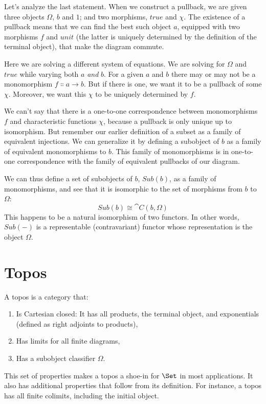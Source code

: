 Let's analyze the last statement. When we construct a pullback, we are
given three objects $\Omega$, $b$ and $1$; and two
morphisms, $true$ and $\chi$. The existence of a pullback
means that we can find the best such object $a$, equipped with
two morphisms $f$ and $unit$ (the latter is uniquely
determined by the definition of the terminal object), that make the
diagram commute.

Here we are solving a different system of equations. We are solving for
$\Omega$ and $true$ while varying both $a$ \emph{and}
$b$. For a given $a$ and $b$ there may or may not
be a monomorphism $f \Colon a \to b$. But if there is one, we
want it to be a pullback of some $\chi$. Moreover, we want this
$\chi$ to be uniquely determined by $f$.

We can't say that there is a one-to-one correspondence between
monomorphisms $f$ and characteristic functions $\chi$,
because a pullback is only unique up to isomorphism. But remember our
earlier definition of a subset as a family of equivalent injections. We
can generalize it by defining a subobject of $b$ as a family of
equivalent monomorphisms to $b$. This family of monomorphisms is
in one-to-one correspondence with the family of equivalent pullbacks of
our diagram.

We can thus define a set of subobjects of $b$, $Sub(b)$,
as a family of monomorphisms, and see that it is isomorphic to the set
of morphisms from $b$ to $\Omega$:
\[Sub(b) \cong \cat{C}(b, \Omega)\]
This happens to be a natural isomorphism of two functors. In other
words, $Sub(-)$ is a representable (contravariant) functor whose
representation is the object $\Omega$.

\section{Topos}

A topos is a category that:

\begin{enumerate}
\tightlist
\item
  Is Cartesian closed: It has all products, the terminal object, and
  exponentials (defined as right adjoints to products),
\item
  Has limits for all finite diagrams,
\item
  Has a subobject classifier $\Omega$.
\end{enumerate}

This set of properties makes a topos a shoe-in for $\Set$ in most
applications. It also has additional properties that follow from its
definition. For instance, a topos has all finite colimits, including the
initial object.

